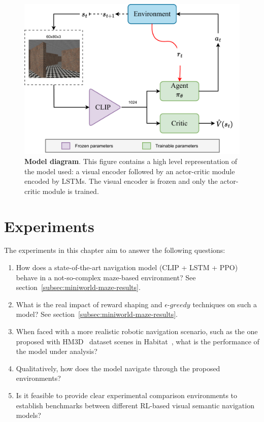 \begin{figure}
    \centering
    \includegraphics[width=\linewidth]{figures/understanding_vsn/network_clip_diagram}
    \caption{\textbf{Model diagram}. This figure contains a high level representation of the model used: a visual encoder followed by an actor-critic module encoded by LSTMs. The visual encoder is frozen and only the actor-critic module is trained.}
    \label{fig:network_clip_diagram}
\end{figure}

\section{Experiments}
\label{sec:experiments}

The experiments in this chapter aim to answer the following questions:
\begin{enumerate}
    \item How does a state-of-the-art navigation model (CLIP + LSTM + PPO) behave in a not-so-complex maze-based environment?
    See section~\ref{subsec:miniworld-maze-results}.
    \item What is the real impact of reward shaping and $\epsilon\text{-}greedy$ techniques on such a model?
    See section~\ref{subsec:miniworld-maze-results}.
    \item When faced with a more realistic robotic navigation scenario, such as the one proposed with HM3D~\cite{ramakrishnan2021} dataset scenes in Habitat~\cite{szot2021}, what is the performance of the model under analysis?
    \item Qualitatively, how does the model navigate through the proposed environments?
    \item Is it feasible to provide clear experimental comparison environments to establish benchmarks between different RL-based visual semantic navigation models?
\end{enumerate}

